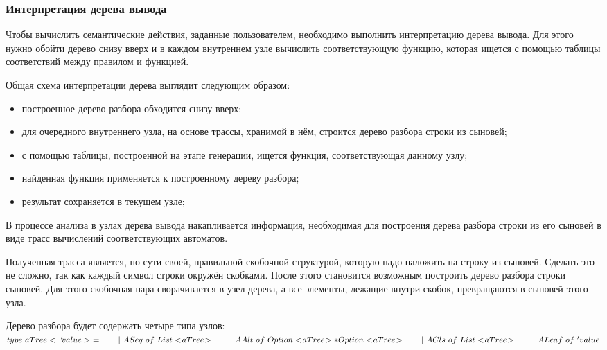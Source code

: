 \subsubsection{Интерпретация дерева вывода}

Чтобы вычислить семантические действия, заданные пользователем, необходимо выполнить интерпретацию дерева вывода. Для этого нужно обойти дерево снизу вверх и в каждом внутреннем узле вычислить соответствующую функцию, которая ищется с помощью таблицы соответствий между правилом и функцией.

Общая схема интерпретации дерева выглядит следующим образом:
\begin{itemize}
  \item построенное дерево разбора обходится снизу вверх;
  \item для очередного внутреннего узла, на основе трассы, хранимой в нём, строится дерево разбора строки из сыновей;
  \item с помощью таблицы, построенной на этапе генерации, ищется функция, соответствующая данному узлу;
  \item найденная функция применяется к построенному дереву разбора;
  \item результат сохраняется в текущем узле;
\end{itemize} 

В процессе анализа в узлах дерева вывода накапливается информация, необходимая для построения дерева разбора строки из его сыновей в виде трасс вычислений соответствующих автоматов.

Полученная трасса является, по сути своей, правильной скобочной структурой, которую надо наложить на строку из сыновей. Сделать это не сложно, так как каждый символ строки окружён скобками. После этого становится возможным построить дерево разбора строки сыновей. Для этого скобочная пара сворачивается в узел дерева, а все элементы, лежащие внутри скобок, превращаются в сыновей этого узла.

Дерево разбора будет содержать четыре типа узлов:\\
$type \ aTree< \ '\!value> \ = \\
\phantom \qquad |\ ASeq \ of \ List<\!aTree\!>\\
\phantom \qquad |\ AAlt \ of \ Option<\!aTree\!> * Option<\!aTree\!>\\
\phantom \qquad |\ ACls \ of \ List<\!aTree\!>\\
\phantom \qquad |\ ALeaf \ of \ 'value\\
$

